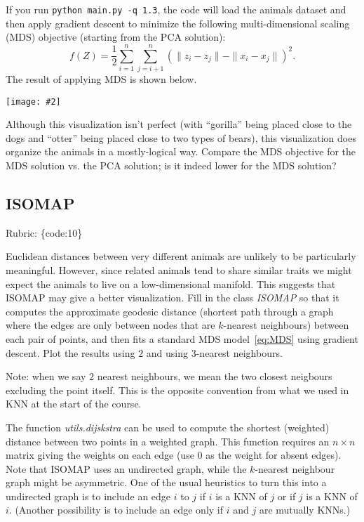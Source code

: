 \documentclass{article}
\def\rubric#1{\gre{Rubric: \{#1\}}}{}
\def\blu#1{{\color{blu}#1}}
\def\gre#1{{\color{gre}#1}}
\def\norm#1{\|#1\|}
\newcommand{\centerfig}[2]{\begin{center}\texttt{[image: \#2]}\end{center}}
\begin{document}
If you run \verb|python main.py -q 1.3|, the code will load the animals dataset and then apply gradient descent to minimize the following multi-dimensional scaling (MDS) objective (starting from the PCA solution):
\begin{equation}
\label{eq:MDS}
f(Z) =  \frac{1}{2}\sum_{i=1}^n\sum_{j=i+1}^n (  \norm{z_i - z_j} - \norm{x_i - x_j})^2.
\end{equation}
 The result of applying MDS is shown below.
\centerfig{.5}{../figs/MDS_animals.png}
Although this visualization isn't perfect (with ``gorilla'' being placed close to the dogs and ``otter'' being placed close to two types of bears), this visualization does organize the animals in a mostly-logical way.
\blu{Compare the MDS objective for the MDS solution vs. the PCA solution; is it indeed lower for the MDS solution?} 

\subsection{ISOMAP}
\rubric{code:10}

Euclidean distances between very different animals are unlikely to be particularly meaningful.
However, since related animals tend to share similar traits we might expect the animals to live on a low-dimensional manifold.
This suggests that ISOMAP may give a better visualization.
Fill in the class \emph{ISOMAP} so that it computes the approximate geodesic distance
(shortest path through a graph where the edges are only between nodes that are $k$-nearest neighbours) between each pair of points,
and then fits a standard MDS model~\eqref{eq:MDS} using gradient descent. \blu{Plot the results using $2$ and using $3$-nearest neighbours}.

Note: when we say $2$ nearest neighbours, we mean the two closest neigbours excluding the point itself. This is the opposite convention from what we used in KNN at the start of the course.

The function \emph{utils.dijskstra} can be used to compute the shortest (weighted) distance between two points in a weighted graph.
This function requires an $n \times n$ matrix giving the weights on each edge (use $0$ as the weight for absent edges).
Note that ISOMAP uses an undirected graph, while the $k$-nearest neighbour graph might be asymmetric.
One of the usual heuristics to turn this into a undirected graph is to include an edge $i$ to $j$ if $i$ is a KNN of $j$ or if $j$ is a KNN of $i$.
(Another possibility is to include an edge only if $i$ and $j$ are mutually KNNs.)
\end{document}
